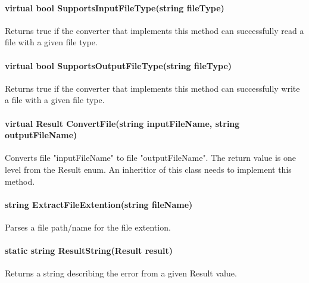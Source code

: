         \paragraph{virtual bool SupportsInputFileType(string fileType)}  
        
        Returns true if the converter that implements this method can successfully read a file with a given file type.

        \paragraph{virtual bool SupportsOutputFileType(string fileType)}
        Returns true if the converter that implements this method can successfully write a file with a given file type.

        \paragraph{virtual Result ConvertFile(string inputFileName, string outputFileName)}
        Converts file "inputFileName" to file "outputFileName".  The return value is one level from the Result enum.  An inheritior of this class needs to implement this method.

        \paragraph{string ExtractFileExtention(string fileName)}

        Parses a file path/name for the file extention.

        \paragraph{static string ResultString(Result result)}
        
        Returns a string describing the error from a given Result value.
